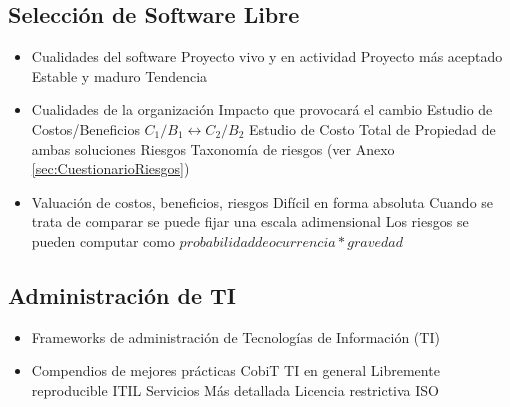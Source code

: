 \subsection {Selección de Software Libre}
\begin{itemize}
	\item Cualidades del software
		\subitem Proyecto vivo y en actividad
		\subitem Proyecto más aceptado
		\subitem Estable y maduro
		\subitem Tendencia
	\item Cualidades de la organización
		\subitem Impacto que provocará el cambio
		\subitem Estudio de Costos/Beneficios 
		\subitem ${C_1/B_1 \longleftrightarrow C_2/B_2}$
		\subitem Estudio de Costo Total de Propiedad de ambas soluciones
		\subitem Riesgos
		\subsubitem Taxonomía de riesgos (ver Anexo \ref{sec:CuestionarioRiesgos})
	\item Valuación de costos, beneficios, riesgos
	\subitem Difícil en forma absoluta
	\subitem Cuando se trata de comparar se puede fijar una escala adimensional
	\subitem Los riesgos se pueden computar como ${probabilidad de ocurrencia * gravedad}$
\end{itemize}

\subsection {Administración de TI}
\begin{itemize}
	\item Frameworks de administración de Tecnologías de Información (TI)
	\item Compendios de mejores prácticas
		\subitem CobiT \url{}
			\subsubitem TI en general
			\subsubitem Libremente reproducible
		\subitem ITIL \url{}
			\subsubitem Servicios
			\subsubitem Más detallada
			\subsubitem Licencia restrictiva
		\subitem ISO
\end{itemize}


